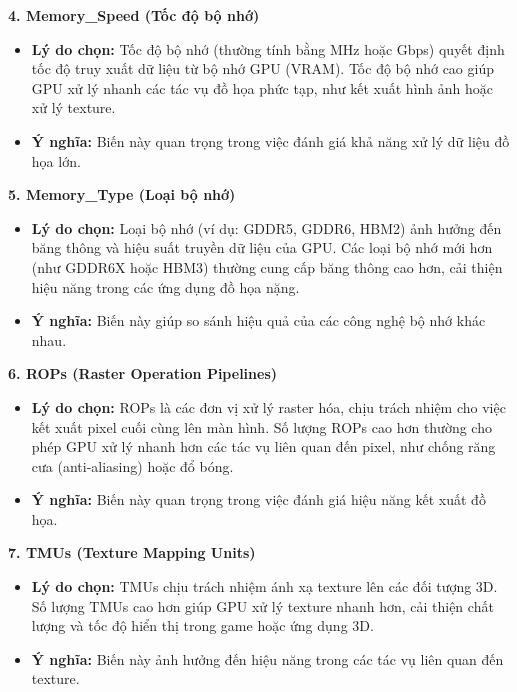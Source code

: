  \textbf{4. Memory\_Speed (Tốc độ bộ nhớ)}

 \begin{itemize}
     \item \textbf{\textbf{Lý do chọn:}} Tốc độ bộ nhớ (thường tính bằng MHz hoặc Gbps) quyết định tốc độ truy xuất dữ liệu từ bộ nhớ GPU (VRAM). Tốc độ bộ nhớ cao giúp GPU xử lý nhanh các tác vụ đồ họa phức tạp, như kết xuất hình ảnh hoặc xử lý texture.
     \item \textbf{Ý nghĩa:} Biến này quan trọng trong việc đánh giá khả năng xử lý dữ liệu đồ họa lớn.
 \end{itemize}

 \textbf{5. Memory\_Type (Loại bộ nhớ)}

 \begin{itemize}
     \item \textbf{\textbf{Lý do chọn:}} Loại bộ nhớ (ví dụ: GDDR5, GDDR6, HBM2) ảnh hưởng đến băng thông và hiệu suất truyền dữ liệu của GPU. Các loại bộ nhớ mới hơn (như GDDR6X hoặc HBM3) thường cung cấp băng thông cao hơn, cải thiện hiệu năng trong các ứng dụng đồ họa nặng.
     \item \textbf{Ý nghĩa:} Biến này giúp so sánh hiệu quả của các công nghệ bộ nhớ khác nhau.
 \end{itemize}

 \textbf{6. ROPs (Raster Operation Pipelines)}

 \begin{itemize}
     \item \textbf{\textbf{Lý do chọn:}} ROPs là các đơn vị xử lý raster hóa, chịu trách nhiệm cho việc kết xuất pixel cuối cùng lên màn hình. Số lượng ROPs cao hơn thường cho phép GPU xử lý nhanh hơn các tác vụ liên quan đến pixel, như chống răng cưa (anti-aliasing) hoặc đổ bóng.
     \item \textbf{Ý nghĩa:} Biến này quan trọng trong việc đánh giá hiệu năng kết xuất đồ họa.
 \end{itemize}

 \textbf{7. TMUs (Texture Mapping Units)}

 \begin{itemize}
     \item \textbf{\textbf{Lý do chọn:}} TMUs chịu trách nhiệm ánh xạ texture lên các đối tượng 3D. Số lượng TMUs cao hơn giúp GPU xử lý texture nhanh hơn, cải thiện chất lượng và tốc độ hiển thị trong game hoặc ứng dụng 3D.
     \item \textbf{Ý nghĩa:} Biến này ảnh hưởng đến hiệu năng trong các tác vụ liên quan đến texture.
 \end{itemize}

